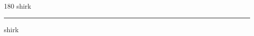 
\begin{frame}
\begin{center}
\begin{turn}{180}
{\fontsize{2.5cm}{1em}\selectfont shirk}
\end{turn}
\vspace{1em}\par  
\hrule
\vspace{1em}\par  
{\fontsize{2.5cm}{1em}\selectfont shirk}
\end{center}
\end{frame}

